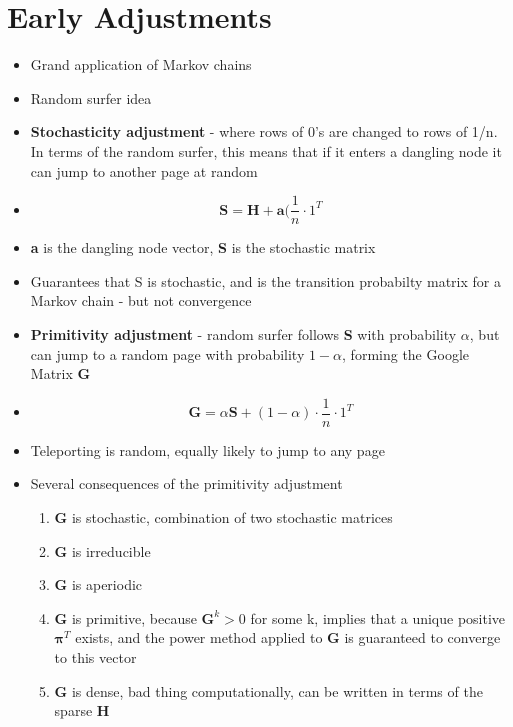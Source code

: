 \documentclass[11pt]{report}
\begin{document}
\section{Early Adjustments}
\begin{itemize}
\item Grand application of Markov chains
\item Random surfer idea
\item \textbf{Stochasticity adjustment} - where rows of 0’s are changed to rows of 1/n. In terms of the random surfer, this means that if it enters a dangling node it can jump to another page at random 
\item \begin{equation}
\textbf{S} = \textbf{H} + \textbf{a}(\frac{1}{n}\cdot 1^{T}
\end{equation}
\item \textbf{a} is the dangling node vector, \textbf{S} is the stochastic matrix
\item Guarantees that S is stochastic, and is the transition probabilty matrix for a Markov chain - but not convergence
\item \textbf{Primitivity adjustment} - random surfer follows \textbf{S} with probability \(\alpha\), but can jump to a random page with probability \(1-\alpha\), forming the Google Matrix \textbf{G}
\item \begin{equation}
\textbf{G} = \alpha\textbf{S} + (1-\alpha)\cdot\frac{1}{n}\cdot 1^{T}
\end{equation}
\item Teleporting is random, equally likely to jump to any page
\item Several consequences of the primitivity adjustment
\begin{enumerate}
\item \textbf{G} is stochastic, combination of two stochastic matrices
\item \textbf{G} is irreducible
\item \textbf{G} is aperiodic
\item \textbf{G} is primitive, because \(\textbf{G}^k>0\) for some k, implies that a unique positive \(\boldsymbol{\pi}^T\) exists, and the power method applied to \textbf{G} is guaranteed to converge to this vector
\item \textbf{G} is dense, bad thing computationally, can be written in terms of the sparse \textbf{H}
\begin{equation}
\begin{split}

\end{split}
\end{equation}
\end{enumerate}
\end{itemize}
\end{document}
